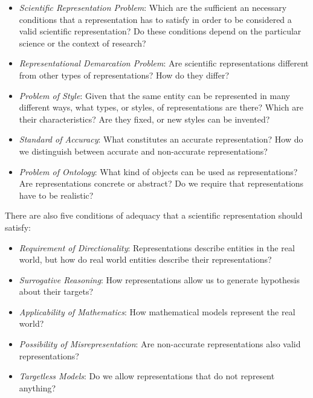 \begin{itemize}

\item \emph{Scientific Representation Problem}: Which are the sufficient an necessary conditions that a representation has to satisfy in order to be considered a valid scientific representation? Do these conditions depend on the particular science or the context of research?

\item \emph{Representational Demarcation Problem}: Are scientific representations different from other types of representations? How do they differ?

\item \emph{Problem of Style}: Given that the same entity can be represented in many different ways, what types, or styles, of representations are there? Which are their characteristics? Are they fixed, or new styles can be invented?

\item \emph{Standard of Accuracy}: What constitutes an accurate representation? How do we distinguish between accurate and non-accurate representations?

\item \emph{Problem of Ontology}: What kind of objects can be used as representations? Are representations concrete or abstract? Do we require that representations have to be realistic?

\end{itemize}

There are also five conditions of adequacy that a scientific representation should satisfy:

\begin{itemize}

\item \emph{Requirement of Directionality}: Representations describe entities in the real world, but how do real world entities describe their representations?

\item \emph{Surrogative Reasoning}: How representations allow us to generate hypothesis about their targets?

\item \emph{Applicability of Mathematics}: How mathematical models represent the real world?

\item \emph{Possibility of Misrepresentation}: Are non-accurate representations also valid representations?

\item \emph{Targetless Models}: Do we allow representations that do not represent anything?

\end{itemize}


